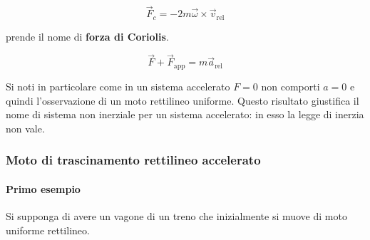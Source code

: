 \[
	\vec{F}_c= -2m\vec{\omega} \times \vec{v}_{\text{rel}}
\]

prende il nome di \textbf{forza di Coriolis}.

\[
	\vec{F}+\vec{F}_{\text{app}}=m\vec{a}_{\text{rel}}
\]

Si noti in particolare come in un sistema accelerato $F=0$ non comporti $a=0$ e quindi l'osservazione di un moto rettilineo uniforme. Questo risultato giustifica il nome di sistema non inerziale per un sistema accelerato: in esso la legge di inerzia non vale.

\subsubsection{Moto di trascinamento rettilineo accelerato}

\paragraph{Primo esempio} Si supponga di avere un vagone di un treno che inizialmente si muove di moto uniforme rettilineo.


